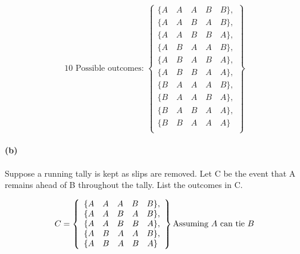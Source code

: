     \begin{mdframed}
        \begin{equation*}
            \text{10 Possible outcomes: }
            \left\{
                \begin{array}{l}
                    \{A \quad A \quad A \quad B \quad B\},  \\
                    \{A \quad A \quad B \quad A \quad B\},  \\
                    \{A \quad A \quad B \quad B \quad A\},  \\
                    \{A \quad B \quad A \quad A \quad B\},  \\
                    \{A \quad B \quad A \quad B \quad A\},  \\
                    \{A \quad B \quad B \quad A \quad A\},  \\
                    \{B \quad A \quad A \quad A \quad B\},  \\
                    \{B \quad A \quad A \quad B \quad A\},  \\
                    \{B \quad A \quad B \quad A \quad A\},  \\
                    \{B \quad B \quad A \quad A \quad A\}   \\
                \end{array}
            \right\}
        \end{equation*}
    \end{mdframed}

    \paragraph*{(b)}
    Suppose a running tally is kept as slips are removed. Let C be the event that A remains ahead of B throughout the tally. List the outcomes in C.

    \begin{mdframed}
        \begin{equation*}
            C = 
            \left\{
                \begin{array}{l}
                    \{A \quad A \quad A \quad B \quad B\},  \\
                    \{A \quad A \quad B \quad A \quad B\},  \\
                    \{A \quad A \quad B \quad B \quad A\},  \\
                    \{A \quad B \quad A \quad A \quad B\},  \\
                    \{A \quad B \quad A \quad B \quad A\}
                \end{array}
            \right\}
            \\
            \text{Assuming $A$ can tie $B$}
        \end{equation*}
    \end{mdframed}

